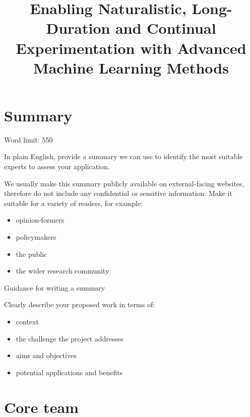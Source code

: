 \documentclass[11pt]{article}
\title{Enabling Naturalistic, Long-Duration and Continual Experimentation with
Advanced Machine Learning Methods}
\newenvironment{instruction}{%
    \begin{tcolorbox}[breakable,colback=red!5,colframe=red,title=Instruction]%
	}{%
    	\end{tcolorbox}%
	}
\begin{document}

\tableofcontents

\pagebreak

\section{Summary}

\begin{instruction}
Word limit: 550

In plain English, provide a summary we can use to identify the most suitable
experts to assess your application.

We usually make this summary publicly available on external-facing websites,
therefore do not include any confidential or sensitive information. Make it
suitable for a variety of readers, for example:

\begin{itemize}
	\item opinion-formers
	\item policymakers
	\item the public
	\item the wider research community
\end{itemize}

Guidance for writing a summary

Clearly describe your proposed work in terms of:

\begin{itemize}
	\item context
	\item the challenge the project addresses
	\item aims and objectives
	\item potential applications and benefits
\end{itemize}

\end{instruction}



\pagebreak
\section{Core team}
\end{document}
